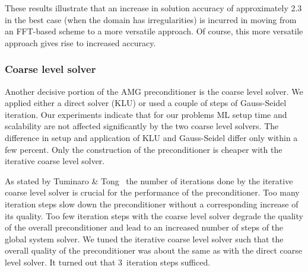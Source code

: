 
These results illustrate that an increase in solution accuracy of approximately
2.3 in the best case (when the domain has irregularities) is incurred in moving
from an FFT-based scheme to a more versatile approach. Of course, this more
versatile approach gives rise to increased accuracy.

\subsubsection*{Coarse level solver}

Another decisive portion of the AMG preconditioner is the coarse level
solver.  We applied either a direct solver (KLU) or used a couple of
steps of Gauss-Seidel iteration.  
Our experiments indicate that for our problems ML setup time and scalability are
not affected significantly by the two coarse level solvers. The difference in
setup and application of KLU and Gauss-Seidel  differ only within a few
percent. Only the construction of the preconditioner is cheaper with the
iterative coarse level solver.  

As stated by Tuminaro \& Tong~\cite{tuto:00} the number of iterations
done by the iterative coarse level solver is crucial for the performance of the
preconditioner.  Too many iteration steps slow down the preconditioner without a
corresponding increase of its quality.  Too
few iteration steps with the coarse level solver degrade the quality of
the overall preconditioner and lead to an increased number of steps of
the global system solver.  We tuned the iterative coarse level solver
such that the overall quality of the preconditioner was about the same
as with the direct coarse level solver.  It turned out that 3~iteration
steps sufficed.


